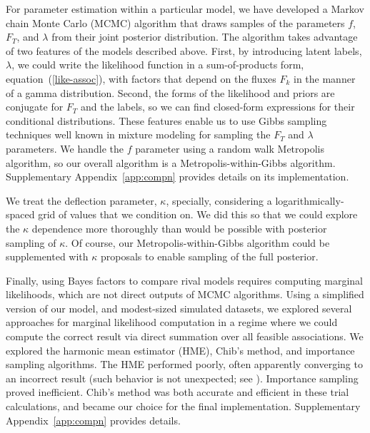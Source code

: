 For parameter estimation within a particular model, we have developed a
Markov chain Monte Carlo (MCMC) algorithm that draws samples of the
parameters $f$, $F_T$, and $\lambda$ from their joint posterior
distribution.  The algorithm takes advantage of two features of the models
described above.  First, by introducing latent labels, $\lambda$, we could
write the likelihood function in a sum-of-products form,
equation~(\ref{like-assoc}), with factors that depend on the fluxes
$F_k$ in the manner of a gamma distribution.  Second, the forms of the
likelihood and priors are conjugate for $F_T$ and the labels, so we can find
closed-form expressions for their conditional distributions.  These features
enable us to use Gibbs sampling techniques well known in mixture modeling
for sampling the $F_T$ and $\lambda$ parameters.  We handle the $f$
parameter using a random walk Metropolis algorithm, so our overall algorithm
is a Metropolis-within-Gibbs algorithm.  Supplementary
Appendix~\ref{app:compn} provides details on its implementation.

We treat the deflection parameter, $\kappa$, specially, considering
a logarithmically-spaced grid of values that we condition on.  We
did this so that we could explore the $\kappa$ dependence more
thoroughly than would be possible with posterior sampling of $\kappa$.
Of course, our Metropolis-within-Gibbs algorithm could be supplemented
with $\kappa$ proposals to enable sampling of the full posterior.

Finally, using Bayes factors to compare rival models requires computing
marginal likelihoods, which are not direct outputs of MCMC algorithms.
Using a simplified version of our model, and modest-sized simulated
datasets, we explored several approaches for marginal likelihood computation
in a regime where we could compute the correct result via direct summation
over all feasible associations.  We explored the harmonic mean estimator
(HME), Chib's method, and importance sampling algorithms.  The HME
performed poorly, often apparently converging to an incorrect result (such
behavior is not unexpected; see \cite{WS12-HMBad}).  Importance sampling
proved inefficient.  Chib's method was both accurate and efficient in these
trial calculations, and became our choice for the final implementation.
Supplementary Appendix~\ref{app:compn} provides details.
